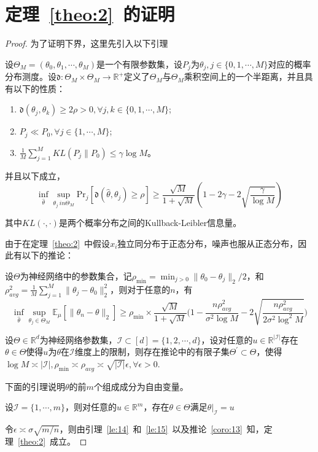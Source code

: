 \section{定理~\ref{theo:2}~的证明}\label{pr:2}

\begin{proof}
为了证明下界，这里先引入以下引理
\begin{lemma}
设$\Theta_M = (\theta_0, \theta_1, \cdots, \theta_M)$是一个有限参数集，设$P_j$为$\theta_j, j\in \{0,1,\cdots, M\}$对应的概率分布测度。设$\mathfrak{d}:\Theta_M\times \Theta_M\rightarrow \mathbb{R}^+$定义了$\Theta_M$与$\Theta_M$乘积空间上的一个半距离，并且具有以下的性质：
\begin{enumerate}
\item $\mathfrak{d}(\theta_j,\theta_k)\geq 2\rho > 0, \forall j,k\in\{0,1,\cdots,M\}$;
\item $P_j \ll P_0, \forall j \in \{1,\cdots, M\}$;
\item $\frac{1}{M}\sum_{j=1}^M KL(P_j\|P_0)\leq \gamma\log M$。 
\end{enumerate}
\par
并且以下成立，
\begin{equation}
\inf_{\hat{\theta}} \sup_{\theta_j\ in \Theta_M} \mathrm{Pr}_j[\mathfrak{d}(\hat{\theta},\theta_j)\geq \rho] \geq \frac{\sqrt{M}}{1+\sqrt{M}}(1-2\gamma-2\sqrt{\frac{\gamma}{\log M}})
\end{equation}
\end{lemma}
\par
其中$KL(\cdot,\cdot)$是两个概率分布之间的Kullback-Leibler信息量。
\par
由于在定理~\ref{theo:2}~中假设$x_i$独立同分布于正态分布，噪声也服从正态分布，因此有以下的推论：
\begin{corollary}\label{coro:13}
设$\Theta$为神经网络中的参数集合，记$\rho_{\min} = \min_{j>0}\|\theta_0- \theta_j\|_2/2$，和$\rho_{avg}^2 = \frac{1}{M}\sum_{j=1}^M \|\theta_j-\theta_0\|^2_2$，则对于任意的$n$，有
\[
\inf_{\hat{\theta}} \sup_{\theta_j\in \Theta_M} \mathbb{E}_\mu [\|\hat{\theta}_n-\theta\|_2] \geq \rho_{\min} \times\frac{\sqrt{M}}{1+\sqrt{M}}\bigg(1-\frac{n\rho_{avg}^2}{\sigma^2\log M}-2\sqrt{\frac{n\rho_{avg}^2}{2\sigma^2\log^2 M}}\bigg)
\]
\end{corollary}

\begin{lemma}\label{le:14}
设$\Theta \in \mathbb{R}^d$为神经网络参数集，$\mathcal{I}\subset [d]=\{1,2,\cdots,d\}$，设对任意的$u \in \mathbb{R}^{|\mathcal{I}|}$存在$\theta\in \Theta$使得$u$为$\theta$在$\mathcal{I}$维度上的限制，则存在推论中的有限子集$\Theta^\prime \subset \Theta$，使得$\log M \asymp |\mathcal{I}|, \rho_{\min} \asymp \rho_{avg} \asymp \sqrt{|\mathcal{I}|}\epsilon, \forall \epsilon > 0$.
\end{lemma}
\par
下面的引理说明$\theta$的前$m$个组成成分为自由变量。
\begin{lemma}\label{le:15}
设$\mathcal{I} = \{1,\cdots,m\}$，则对任意的$u\in \mathbb{R}^m$，存在$\theta \in \Theta$满足$\theta|_{\mathcal{I}} = u$
\end{lemma}

\par
令$\epsilon \asymp \sigma \sqrt{m/n}$，则由引理~\ref{le:14}~和~\ref{le:15}~以及推论~\ref{coro:13}~知，定理~\ref{theo:2}~成立。

\end{proof}


